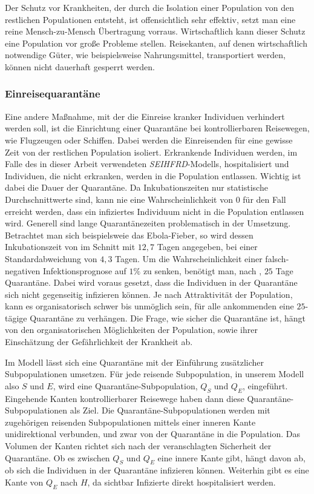 Der Schutz vor Krankheiten, der durch die Isolation einer Population von den restlichen Populationen entsteht, ist offensichtlich sehr effektiv, setzt man eine reine Mensch-zu-Mensch Übertragung vorraus. Wirtschaftlich kann dieser Schutz eine Population vor große Probleme stellen. Reisekanten, auf denen wirtschaftlich notwendige Güter, wie beispielsweise Nahrungsmittel, transportiert werden, können nicht dauerhaft gesperrt werden. 

\subsubsection{Einreisequarantäne}
Eine andere Maßnahme, mit der die Einreise kranker Individuen verhindert werden soll, ist die Einrichtung einer Quarantäne bei kontrollierbaren Reisewegen, wie Flugzeugen oder Schiffen. Dabei werden die Einreisenden für eine gewisse Zeit von der restlichen Population isoliert. Erkrankende Individuen werden, im Falle des in dieser Arbeit verwendeten \emph{SEIHFRD}-Modells, hospitalisiert und Individuen, die nicht erkranken, werden in die Population entlassen. Wichtig ist dabei die Dauer der Quarantäne. Da Inkubationszeiten nur statistische Durchschnittwerte sind, kann nie eine Wahrscheinlichkeit von 0 für den Fall erreicht werden, dass ein infiziertes Individuum nicht in die Population entlassen wird. Generell sind lange Quarantänezeiten problematisch in der Umsetzung. Betrachtet man sich beispielsweie das Ebola-Fieber, so wird dessen Inkubationszeit von \cite{Eichner2011} im Schnitt mit $12,7$ Tagen angegeben, bei einer Standardabweichung von $4,3$ Tagen. Um die Wahrscheinlichkeit einer falsch-negativen Infektionsprognose auf $1\%$ zu senken, benötigt man, nach \cite[4]{Eichner2011}, $25$ Tage Quarantäne. Dabei wird voraus gesetzt, dass die Individuen in der Quarantäne sich nicht gegenseitig infizieren können. Je nach Attraktivität der Population, kann es organisatorisch schwer bis unmöglich sein, für alle ankommenden eine $25$-tägige Quarantäne zu verhängen. Die Frage, wie sicher die Quarantäne ist, hängt von den organisatorischen Möglichkeiten der Population, sowie ihrer Einschätzung der Gefährlichkeit der Krankheit ab. 

Im Modell lässt sich eine Quarantäne mit der Einführung zusätzlicher Subpopulationen umsetzen. Für jede reisende Subpopulation, in unserem Modell also $S$ und $E$, wird eine Quarantäne-Subpopulation, $Q_S$ und $Q_E$, eingeführt. Eingehende Kanten kontrollierbarer Reisewege haben dann diese Quarantäne-Subpopulationen als Ziel. Die Quarantäne-Subpopulationen werden mit zugehörigen reisenden Subpopulationen mittels einer inneren Kante unidirektional verbunden, und zwar von der Quarantäne in die Population. Das Volumen der Kanten richtet sich nach der veranschlagten Sicherheit der Quarantäne. Ob es zwischen $Q_S$ und $Q_E$ eine innere Kante gibt, hängt davon ab, ob sich die Individuen in der Quarantäne infizieren können. Weiterhin gibt es eine Kante von $Q_E$ nach $H$, da sichtbar Infizierte direkt hospitalisiert werden. 

